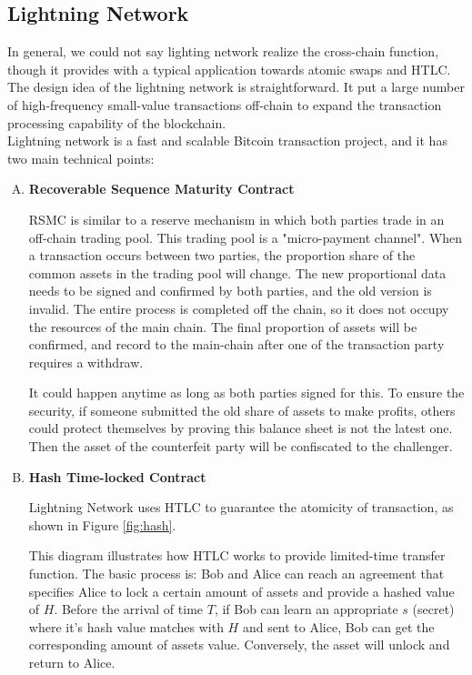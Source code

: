 \subsection{Lightning Network}
\noindent In general, we could not say lighting network realize the cross-chain function, though it provides with a typical application towards atomic swaps and HTLC. The design idea of the lightning network is straightforward. It put a large number of high-frequency small-value transactions off-chain to expand the transaction processing capability of the blockchain.\\
\noindent Lightning network\cite{poon2016bitcoin} is a fast and scalable Bitcoin transaction project, and it has two main technical points:
\begin{enumerate}[A.]
    \item \textbf{Recoverable Sequence Maturity Contract} 
    
    	RSMC is similar to a reserve mechanism in which both parties trade in an
    	off-chain trading pool. This trading pool is a "micro-payment channel".
    	When a transaction occurs between two parties, the proportion share of the
    	common assets in the trading pool will change. The new proportional data
    	needs to be signed and confirmed by both parties, and the old version is invalid. The entire process is completed off the chain,
    	so it does not occupy the resources of the main chain. The final
    	proportion of assets will be confirmed, and record to the main-chain after
    	one of the transaction party requires a withdraw.
    	
    	It could happen anytime as long as both parties signed for this. To ensure
    	the security, if someone submitted the old share of assets to make
    	profits, others could protect themselves by proving this balance sheet is
    	not the latest one. Then the asset of the counterfeit party will be
    	confiscated to the challenger.
    \item \textbf{Hash Time-locked Contract}
    
     Lightning Network uses HTLC to guarantee the atomicity of transaction, as
     shown in Figure \ref{fig:hash}. 
     
     This diagram illustrates how HTLC works to
     provide limited-time transfer function. The basic process is: Bob and Alice
     can reach an agreement that specifies Alice to lock a certain amount of
     assets and provide a hashed value of $H$. Before the arrival of time $T$, if
     Bob can learn an appropriate $s$ (secret) where it's hash value matches with
     $H$ and sent to Alice, Bob can get the corresponding amount of assets value.
     Conversely, the asset will unlock and return to Alice.
\end{enumerate}
